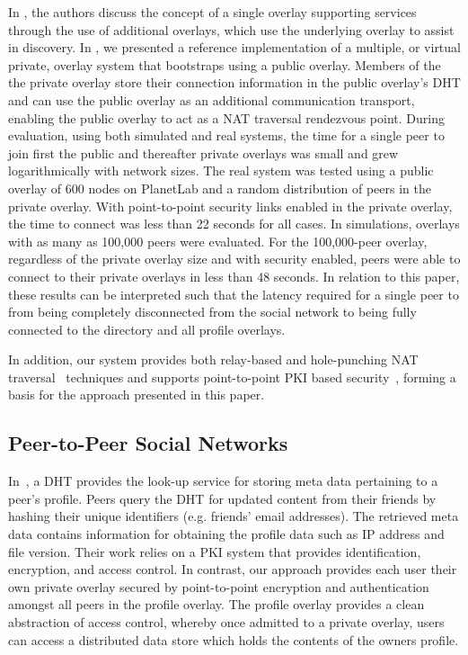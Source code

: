 \documentclass[conference]{IEEEtran}
\begin{document}
In \cite{one_ring, can_multicast}, the authors discuss the concept of a single
overlay supporting services through the use of additional overlays, which use
the underlying overlay to assist in discovery.  In \cite{icdcs10}, we
presented a reference implementation of a multiple, or virtual private, overlay
system that bootstraps using a public overlay.  Members of the the private
overlay store their connection information in the public overlay's DHT and can
use the public overlay as an additional communication transport, enabling the
public overlay to act as a NAT traversal rendezvous point.  During evaluation,
using both simulated and real systems, the time for a single peer to join first
the public and thereafter private overlays was small and grew logarithmically
with network sizes.  The real system was tested using a public overlay of 600
nodes on PlanetLab and a random distribution of peers in the private overlay.
With point-to-point security links enabled in the private overlay, the time to
connect was less than 22 seconds for all cases. In simulations, overlays with as
many as 100,000 peers were evaluated.  For the 100,000-peer overlay, regardless
of the private overlay size and with security enabled, peers were able to connect
to their private overlays in less than 48 seconds.  In relation to this paper,
these results can be interpreted such that the latency required for a single peer
to from being completely disconnected from the social network to being fully
connected to the directory and all profile overlays.

In addition, our system provides both relay-based and hole-punching NAT
traversal~\cite{nsdi10} techniques and supports point-to-point
PKI based security~\cite{icdcs10}, forming a basis for the approach
presented in this paper.

\subsection{Peer-to-Peer Social Networks}
In~\cite{peerson}, a DHT provides the look-up service for storing meta data
pertaining to a peer's profile. Peers query the DHT for updated content from 
their friends by hashing their unique identifiers (e.g. friends' email
addresses).  The retrieved meta data contains information for obtaining the
profile data such as IP address and file version. Their work relies
on a PKI system that provides identification, encryption, and access control.
In contrast, our approach provides each user their own private overlay secured
by point-to-point encryption and authentication amongst all peers in the profile
overlay.  The profile overlay provides a clean abstraction of access control,
whereby once admitted to a private overlay, users can access a distributed data
store which holds the contents of the owners profile.
\end{document}

